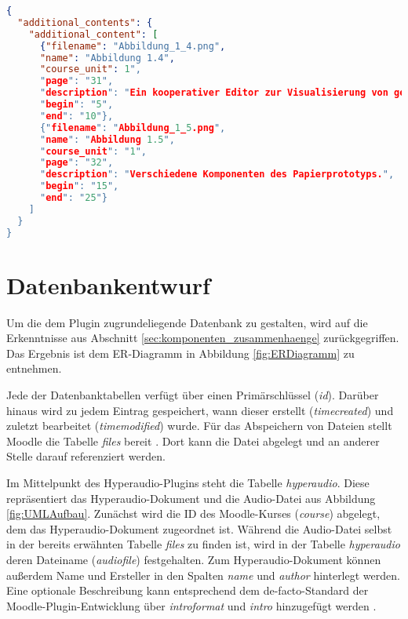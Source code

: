 \begin{lstlisting}[language=json,
             linewidth=\textwidth,
             caption={Beispielhafte Konfigurationsdatei},
             label={lst:JSON}]             
{
  "additional_contents": {
    "additional_content": [
      {"filename": "Abbildung_1_4.png",
      "name": "Abbildung 1.4",
      "course_unit": 1", 
      "page": "31",
      "description": "Ein kooperativer Editor zur Visualisierung von gemeinsam zu lernenden Vokabeln.",
      "begin": "5",
      "end": "10"},
      {"filename": "Abbildung_1_5.png",
      "name": "Abbildung 1.5",
      "course_unit": "1",
      "page": "32",
      "description": "Verschiedene Komponenten des Papierprototyps.",
      "begin": "15",
      "end": "25"}
    ]
  }
}
\end{lstlisting}

\section{Datenbankentwurf}
\label{sec:datenbank}
Um die dem Plugin zugrundeliegende Datenbank zu gestalten, wird auf die Erkenntnisse aus Abschnitt \ref{sec:komponenten_zusammenhaenge} zurückgegriffen. Das Ergebnis ist dem ER-Diagramm in Abbildung \ref{fig:ERDiagramm} zu entnehmen.

Jede der Datenbanktabellen verfügt über einen Primärschlüssel (\textit{id}). Darüber hinaus wird zu jedem Eintrag gespeichert, wann dieser erstellt (\textit{timecreated}) und zuletzt bearbeitet (\textit{timemodified}) wurde. Für das Abspeichern von Dateien stellt Moodle die Tabelle \textit{files} bereit \citep{moodle2018file}. Dort kann die Datei abgelegt und an anderer Stelle darauf referenziert werden.

Im Mittelpunkt des Hyperaudio-Plugins steht die Tabelle \textit{hyperaudio}. Diese repräsentiert das Hyperaudio-Dokument und die Audio-Datei aus Abbildung \ref{fig:UMLAufbau}. Zunächst wird die ID des Moodle-Kurses (\textit{course}) abgelegt, dem das Hyperaudio-Dokument zugeordnet ist. Während die Audio-Datei selbst in der bereits erwähnten Tabelle \textit{files} zu finden ist, wird in der Tabelle \textit{hyperaudio} deren Dateiname (\textit{audiofile}) festgehalten. Zum Hyperaudio-Dokument können außerdem Name und Ersteller in den Spalten \textit{name} und \textit{author} hinterlegt werden. Eine optionale Beschreibung kann entsprechend dem de-facto-Standard der Moodle-Plugin-Entwicklung über \textit{introformat} und \textit{intro} hinzugefügt werden \citep{moodle2016activity}.

